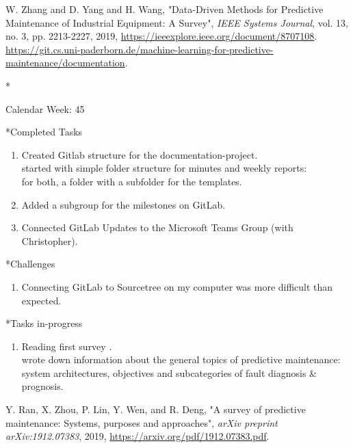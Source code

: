 \documentclass[11pt,a4paper]{article}
\begin{document}
\begin{section}
\begin{thebibliography}{9}
		{W. {Zhang} and D. {Yang} and H. {Wang}},
		"Data-Driven Methods for Predictive Maintenance of Industrial Equipment: A Survey",
		\textit{IEEE Systems Journal},
		vol. 13,
		no. 3,
		pp. 2213-2227,
		2019,
		\href{https://ieeexplore.ieee.org/document/8707108}{https://ieeexplore.ieee.org/document/8707108}.
		\href{https://git.cs.uni-paderborn.de/machine-learning-for-predictive-maintenance/documentation}{https://git.cs.uni-paderborn.de/machine-learning-for-predictive-maintenance/documentation}.
	\end{thebibliography}
\end{section}
\newpage
\begin{section}*{Calendar Week: 45 \hfill \date{06 November, 2020}}
	
	\begin{subsection}*{Completed Tasks}
		\begin{enumerate}
			\item
			Created Gitlab structure for the documentation-project.\\
			started with simple folder structure for minutes and weekly reports:\\
			for both, a folder with a subfolder for the templates.
			\item
			Added a subgroup for the milestones on GitLab.
			\item
			Connected GitLab Updates to the Microsoft Teams Group (with Christopher).
		\end{enumerate}
	\end{subsection}
	
	\begin{subsection}*{Challenges}
		\begin{enumerate}
			\item
			Connecting GitLab to Sourcetree on my computer was more difficult than expected.
		\end{enumerate}
	\end{subsection}
	
	\begin{subsection}*{Tasks in-progress}
		\begin{enumerate}
			\item
			Reading first survey \cite{survey1}.\\
			wrote down information about the general topics of predictive maintenance: system architectures, objectives and subcategories of fault diagnosis \& prognosis.
		\end{enumerate}
	\end{subsection}
	
	\begin{thebibliography}{9}
		{Y. Ran, X. Zhou, P. Lin, Y. Wen, and R. Deng},
		"A survey of predictive maintenance: Systems, purposes and approaches",
		\textit{arXiv preprint arXiv:1912.07383},
		2019,
		\href{https://arxiv.org/pdf/1912.07383.pdf}{https://arxiv.org/pdf/1912.07383.pdf}.
	\end{thebibliography}
\end{section}
\end{document}
